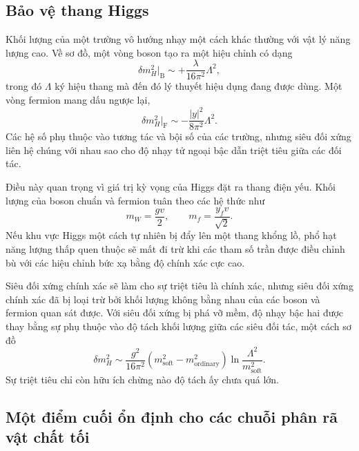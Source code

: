 \subsection{Bảo vệ thang Higgs}

Khối lượng của một trường vô hướng nhạy một cách khác thường với vật lý năng lượng cao. Về sơ đồ, một vòng boson tạo ra một hiệu chỉnh có dạng
\begin{equation}
\delta m_H^2\big|_{\mathrm B}
\sim +\frac{\lambda}{16\pi^2}\Lambda^2,
\end{equation}
trong đó \(\Lambda\) ký hiệu thang mà đến đó lý thuyết hiệu dụng đang được dùng. Một vòng fermion mang dấu ngược lại,
\begin{equation}
\delta m_H^2\big|_{\mathrm F}
\sim -\frac{|y|^2}{8\pi^2}\Lambda^2.
\end{equation}
Các hệ số phụ thuộc vào tương tác và bội số của các trường, nhưng siêu đối xứng liên hệ chúng với nhau sao cho độ nhạy tử ngoại bậc dẫn triệt tiêu giữa các đối tác.

Điều này quan trọng vì giá trị kỳ vọng của Higgs đặt ra thang điện yếu. Khối lượng của boson chuẩn và fermion tuân theo các hệ thức như
\begin{equation}
m_W=\frac{gv}{2},
\qquad
m_f=\frac{y_fv}{\sqrt2}.
\end{equation}
Nếu khu vực Higgs một cách tự nhiên bị đẩy lên một thang khổng lồ, phổ hạt năng lượng thấp quen thuộc sẽ mất đi trừ khi các tham số trần được điều chỉnh bù với các hiệu chỉnh bức xạ bằng độ chính xác cực cao.

Siêu đối xứng chính xác sẽ làm cho sự triệt tiêu là chính xác, nhưng siêu đối xứng chính xác đã bị loại trừ bởi khối lượng không bằng nhau của các boson và fermion quan sát được. Với siêu đối xứng bị phá vỡ mềm, độ nhạy bậc hai được thay bằng sự phụ thuộc vào độ tách khối lượng giữa các siêu đối tác, một cách sơ đồ
\begin{equation}
\delta m_H^2
\sim
\frac{g^2}{16\pi^2}
\left(m_{\mathrm{soft}}^2-m_{\mathrm{ordinary}}^2\right)
\ln\frac{\Lambda^2}{m_{\mathrm{soft}}^2}.
\end{equation}
Sự triệt tiêu chỉ còn hữu ích chừng nào độ tách ấy chưa quá lớn.

\subsection{Một điểm cuối ổn định cho các chuỗi phân rã vật chất tối}

